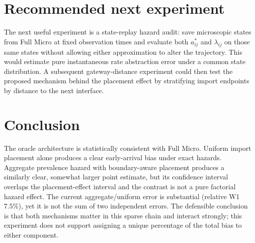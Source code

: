 \documentclass[11pt]{article}
\begin{document}
\section{Recommended next experiment}
The next useful experiment is a state-replay hazard audit: save microscopic states from Full Micro at fixed observation times and evaluate both $a^*_{ij}$ and $\lambda_{ij}$ on those same states without allowing either approximation to alter the trajectory. This would estimate pure instantaneous rate abstraction error under a common state distribution. A subsequent gateway-distance experiment could then test the proposed mechanism behind the placement effect by stratifying import endpoints by distance to the next interface.

\section{Conclusion}
The oracle architecture is statistically consistent with Full Micro. Uniform import placement alone produces a clear early-arrival bias under exact hazards. Aggregate prevalence hazard with boundary-aware placement produces a similarly clear, somewhat larger point estimate, but its confidence interval overlaps the placement-effect interval and the contrast is not a pure factorial hazard effect. The current aggregate/uniform error is substantial (relative W1 $7.5\%$), yet it is not the sum of two independent errors. The defensible conclusion is that both mechanisms matter in this sparse chain and interact strongly; this experiment does not support assigning a unique percentage of the total bias to either component.
\end{document}
